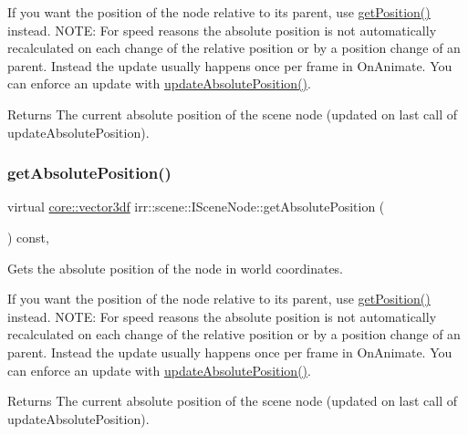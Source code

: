If you want the position of the node relative to its parent, use \hyperlink{classirr_1_1scene_1_1ISceneNode_af5686d35e868e7d295c2d2cb84799d20}{get\+Position()} instead. N\+O\+TE\+: For speed reasons the absolute position is not automatically recalculated on each change of the relative position or by a position change of an parent. Instead the update usually happens once per frame in On\+Animate. You can enforce an update with \hyperlink{classirr_1_1scene_1_1ISceneNode_aeb6e0dc034bb2101600ce87acbcf0f6e}{update\+Absolute\+Position()}. \begin{DoxyReturn}{Returns}
The current absolute position of the scene node (updated on last call of update\+Absolute\+Position). 
\end{DoxyReturn}
\mbox{\label{classirr_1_1scene_1_1ISceneNode_a09a1c2ce3cf5448197a0c7b0bb16a516}} 
\subsubsection{\texorpdfstring{get\+Absolute\+Position()}{getAbsolutePosition()}\hspace{0.1cm}{\footnotesize\ttfamily [2/2]}}
{\footnotesize\ttfamily virtual \hyperlink{namespaceirr_1_1core_ae6e2b2a6c552833ebbd5b7463d03586b}{core\+::vector3df} irr\+::scene\+::\+I\+Scene\+Node\+::get\+Absolute\+Position (\begin{DoxyParamCaption}{ }\end{DoxyParamCaption}) const\hspace{0.3cm}{\ttfamily [inline]}, {\ttfamily [virtual]}}



Gets the absolute position of the node in world coordinates. 

If you want the position of the node relative to its parent, use \hyperlink{classirr_1_1scene_1_1ISceneNode_af5686d35e868e7d295c2d2cb84799d20}{get\+Position()} instead. N\+O\+TE\+: For speed reasons the absolute position is not automatically recalculated on each change of the relative position or by a position change of an parent. Instead the update usually happens once per frame in On\+Animate. You can enforce an update with \hyperlink{classirr_1_1scene_1_1ISceneNode_aeb6e0dc034bb2101600ce87acbcf0f6e}{update\+Absolute\+Position()}. \begin{DoxyReturn}{Returns}
The current absolute position of the scene node (updated on last call of update\+Absolute\+Position). 
\end{DoxyReturn}
\mbox{\label{classirr_1_1scene_1_1ISceneNode_af13dc546a7be796cc0868a2eec51e508}} 
